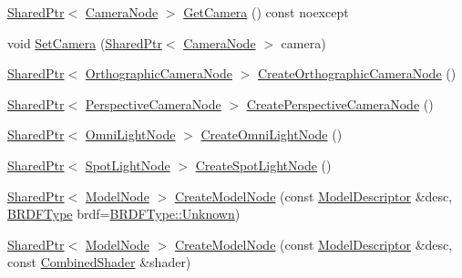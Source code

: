 \begin{DoxyCompactItemize}
\hyperlink{namespacemage_a1e01ae66713838a7a67d30e44c67703e}{Shared\+Ptr}$<$ \hyperlink{classmage_1_1_camera_node}{Camera\+Node} $>$ \hyperlink{classmage_1_1_scene_ad77fe833ca79bf862e1929dfdeb0f1fd}{Get\+Camera} () const noexcept
\item 
void \hyperlink{classmage_1_1_scene_a7568ec0884d04812af2f70990c8ec80d}{Set\+Camera} (\hyperlink{namespacemage_a1e01ae66713838a7a67d30e44c67703e}{Shared\+Ptr}$<$ \hyperlink{classmage_1_1_camera_node}{Camera\+Node} $>$ camera)
\item 
\hyperlink{namespacemage_a1e01ae66713838a7a67d30e44c67703e}{Shared\+Ptr}$<$ \hyperlink{namespacemage_a7d62ab5877be3e14a9735014b77d3f55}{Orthographic\+Camera\+Node} $>$ \hyperlink{classmage_1_1_scene_a9ed9e3a611434f62427c7bd4c16d2456}{Create\+Orthographic\+Camera\+Node} ()
\item 
\hyperlink{namespacemage_a1e01ae66713838a7a67d30e44c67703e}{Shared\+Ptr}$<$ \hyperlink{namespacemage_ad6f2ef4a25873e73e8fa38b06425939f}{Perspective\+Camera\+Node} $>$ \hyperlink{classmage_1_1_scene_a3f4141d407133e6419af92376bc3ecc1}{Create\+Perspective\+Camera\+Node} ()
\item 
\hyperlink{namespacemage_a1e01ae66713838a7a67d30e44c67703e}{Shared\+Ptr}$<$ \hyperlink{namespacemage_a1724c6e6b6b5ba535cdd967cbbb4a669}{Omni\+Light\+Node} $>$ \hyperlink{classmage_1_1_scene_a370f5ce63a6277a1369c1545f0acbffa}{Create\+Omni\+Light\+Node} ()
\item 
\hyperlink{namespacemage_a1e01ae66713838a7a67d30e44c67703e}{Shared\+Ptr}$<$ \hyperlink{namespacemage_aeed5dee4ff6c591eabb0e9114256df4a}{Spot\+Light\+Node} $>$ \hyperlink{classmage_1_1_scene_a27ffb510eeb8e208ba20ee0d76138a3f}{Create\+Spot\+Light\+Node} ()
\item 
\hyperlink{namespacemage_a1e01ae66713838a7a67d30e44c67703e}{Shared\+Ptr}$<$ \hyperlink{classmage_1_1_model_node}{Model\+Node} $>$ \hyperlink{classmage_1_1_scene_a5928fe1e71e816f6b13d055ee5dfa239}{Create\+Model\+Node} (const \hyperlink{classmage_1_1_model_descriptor}{Model\+Descriptor} \&desc, \hyperlink{namespacemage_ae7a7a03a7b34d7e2689689bb8295cd38}{B\+R\+D\+F\+Type} brdf=\hyperlink{namespacemage_ae7a7a03a7b34d7e2689689bb8295cd38a88183b946cc5f0e8c96b2e66e1c74a7e}{B\+R\+D\+F\+Type\+::\+Unknown})
\item 
\hyperlink{namespacemage_a1e01ae66713838a7a67d30e44c67703e}{Shared\+Ptr}$<$ \hyperlink{classmage_1_1_model_node}{Model\+Node} $>$ \hyperlink{classmage_1_1_scene_ae21a831a792ab16b1459cfa8b65a2508}{Create\+Model\+Node} (const \hyperlink{classmage_1_1_model_descriptor}{Model\+Descriptor} \&desc, const \hyperlink{structmage_1_1_combined_shader}{Combined\+Shader} \&shader)

\end{DoxyCompactItemize}

